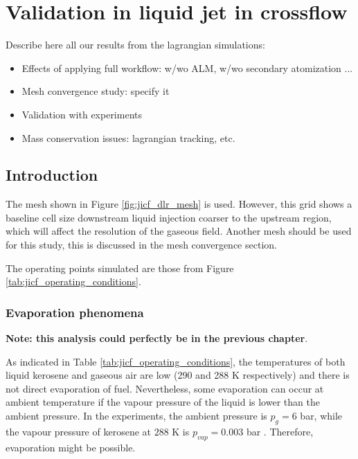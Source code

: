 \chapter{Validation in liquid jet in crossflow}
	\label{ch6:jicf_lgs_simulations}


Describe here all our results from the lagrangian simulations:

\begin{itemize}

	\item Effects of applying full workflow: w/wo ALM, w/wo secondary atomization ...
	
	\item Mesh convergence study: specify it
	
	\item Validation with experiments
	
	\item Mass conservation issues: lagrangian tracking, etc. 
	

\end{itemize}



\section{Introduction}

The mesh shown in Figure \ref{fig:jicf_dlr_mesh} is used. However, this grid shows a baseline cell size downstream liquid injection coarser to the upstream region, which will affect the resolution of the gaseous field. Another mesh should be used for this study, this is discussed in the mesh convergence section.

The operating points simulated are those from Figure \ref{tab:jicf_operating_conditions}.

\subsection{Evaporation phenomena}

\textbf{Note: this analysis could perfectly be in the previous chapter}.

As indicated in Table \ref{tab:jicf_operating_conditions}, the temperatures of both liquid kerosene and gaseous air are low (290 and 288 K respectively) and there is not direct evaporation of fuel. Nevertheless, some evaporation can occur at ambient temperature if the vapour pressure of the liquid is lower than the ambient pressure. In the experiments, the ambient pressure is $p_g = 6$ bar, while the vapour pressure of kerosene at $288$ K is $p_{vap} = 0.003$ bar . Therefore, evaporation might be possible.

